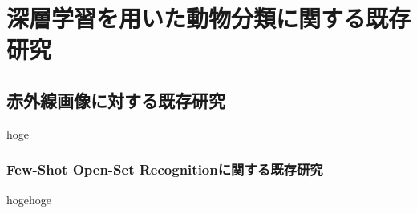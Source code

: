 \documentclass[a4paper,11pt,nomag]{jsreport}
\begin{document}
\chapter*{深層学習を用いた動物分類に関する既存研究}

\setcounter{chapter}{1}
\section{赤外線画像に対する既存研究}

hoge \cite{schneider2020}


\subsection{Few-Shot Open-Set Recognitionに関する既存研究}

hogehoge \cite{peeler}



\end{document}
